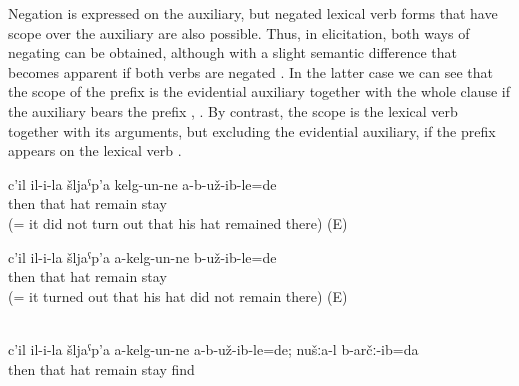 Negation is expressed on the auxiliary, but negated lexical verb forms that have scope over the auxiliary are also possible. Thus, in elicitation, both ways of negating can be obtained, although with a slight semantic difference that becomes apparent if both verbs are negated . In the latter case we can see that the scope of the  prefix is the evidential auxiliary together with the whole clause if the auxiliary bears the prefix , . By contrast, the scope is the lexical verb together with its arguments, but excluding the evidential auxiliary, if the prefix appears on the lexical verb .
%
\begin{exe}
		\ex	\label{ex:Then (apparently) his hat did not remain there@14a}
		\gll	c'il	il-i-la	šljaˁp'a	kelg-un-ne	a-b-už-ib-le=de\\
			then	that	hat	remain	stay\\
		\glt	{} (= it did not turn out that his hat remained there) (E)

		\ex	\label{ex:Then (apparently) his hat did not remain there@14b}
		\gll	c'il	il-i-la	šljaˁp'a	a-kelg-un-ne	b-už-ib-le=de\\
			then	that	hat	remain	stay\\
		\glt	{} (= it turned out that his hat did not remain there) (E)

		\\\label{ex:Then it did not turn out that his hat did not remain there, but (by contrast) we found it (there)@14c}%
		\gll	c'il	il-i-la	šljaˁp'a	a-kelg-un-ne	a-b-už-ib-le=de; nušːa-l	b-arčː-ib=da\\
			then	that	hat	remain	stay		find\\
		\glt	{}
\end{exe}

